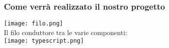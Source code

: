 \begin{frame}
  \frametitle{Come verrà realizzato il nostro progetto}
  \centering
  \texttt{[image: filo.png]} \\
  Il filo conduttore tra le varie componenti:\\
  
  \texttt{[image: typescript.png]}
\end{frame}
